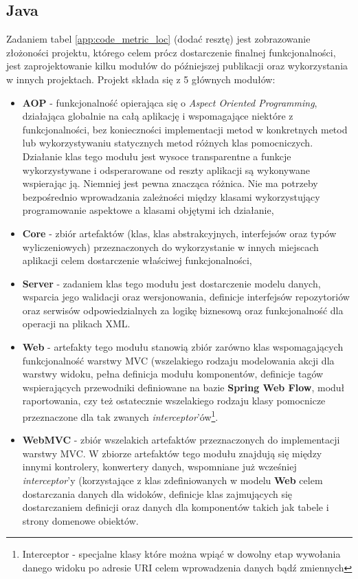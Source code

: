 	\subsection{Java}
	Zadaniem tabel \ref{app:code_metric_loc} (dodać resztę) jest zobrazowanie złożoności projektu, którego celem prócz dostarczenie finalnej funkcjonalności, jest zaprojektowanie
	kilku modułów do późniejszej publikacji oraz wykorzystania w innych projektach. Projekt składa się z 5 głównych modułów:
	\begin{itemize}
		\item \textbf{AOP} - funkcjonalność opierająca się o \textit{Aspect Oriented Programming}, działająca globalnie na całą aplikację i wspomagające niektóre z funkcjonalności,
		bez konieczności implementacji metod w konkretnych metod lub wykorzystywaniu statycznych metod różnych klas pomocniczych. Działanie klas tego modułu jest wysoce transparentne
		a funkcje wykorzystywane i odsperarowane od reszty aplikacji są wykonywane wspierając ją. Niemniej jest pewna znacząca różnica. Nie ma potrzeby bezpośrednio wprowadzania 
		zależności między klasami wykorzystujący programowanie aspektowe a klasami objętymi ich działanie,
		\item \textbf{Core} - zbiór artefaktów (klas, klas abstrakcyjnych, interfejsów oraz typów wyliczeniowych) przeznaczonych do wykorzystanie w innych miejscach aplikacji celem
		dostarczenie właściwej funkcjonalności,
		\item \textbf{Server} - zadaniem klas tego modułu jest dostarczenie modelu danych, wsparcia jego walidacji oraz wersjonowania, definicje interfejsów repozytoriów oraz serwisów odpowiedzialnych
		za logikę biznesową oraz funkcjonalność dla operacji na plikach XML. 
		\item \textbf{Web} - artefakty tego modułu stanowią zbiór zarówno klas wspomagających funkcjonalność warstwy MVC (wszelakiego rodzaju modelowania akcji dla warstwy widoku, pełna definicja
		modułu komponentów, definicje tagów wspierających przewodniki definiowane na bazie \textbf{Spring Web Flow}, moduł raportowania, czy też ostatecznie wszelakiego rodzaju klasy pomocnicze
		przeznaczone dla tak zwanych \textit{interceptor}'ów\footnote{Interceptor - specjalne klasy które można wpiąć w dowolny etap wywołania danego widoku po adresie URI celem wprowadzenia
		danych bądź zmiennych}.
		\item \textbf{WebMVC} - zbiór wszelakich artefaktów przeznaczonych do implementacji warstwy MVC. W zbiorze artefaktów tego modułu znajdują się między innymi kontrolery, konwertery danych,
		wspomniane już wcześniej \textit{interceptor}'y (korzystające z klas zdefiniowanych w modelu \textbf{Web} celem dostarczania danych dla widoków, definicje klas zajmujących się dostarczaniem
		definicji oraz danych dla komponentów takich jak tabele i strony domenowe obiektów.
	\end{itemize}	
